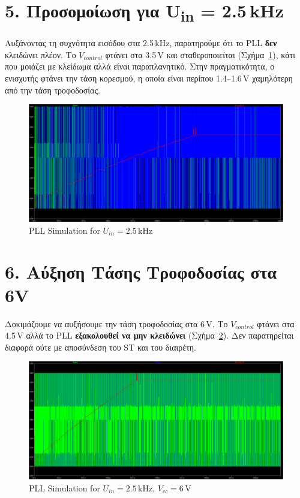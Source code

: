\documentclass[11pt,letterpaper]{article}
\begin{document}
\section*{5. Προσομοίωση για U\textsubscript{in} = 2.5 kHz}
Αυξάνοντας τη συχνότητα εισόδου στα 2.5 kHz, παρατηρούμε ότι το PLL \textbf{δεν} κλειδώνει πλέον. Το \( V_{control} \) φτάνει στα 3.5 V και σταθεροποιείται (Σχήμα~\ref{fig:pll_simulation_2.5khz}), κάτι που μοιάζει με κλείδωμα αλλά είναι παραπλανητικό.
Στην πραγματικότητα, ο ενισχυτής φτάνει την τάση κορεσμού, η οποία είναι περίπου 1.4–1.6 V χαμηλότερη από την τάση τροφοδοσίας.

\begin{figure}[H]
    \centering
    \includegraphics[width=\textwidth]{figures/sim4.png}
    \caption{PLL Simulation for \( U_{in} = 2.5\,\text{kHz} \)}
    \label{fig:pll_simulation_2.5khz}
\end{figure}


\section*{6. Αύξηση Τάσης Τροφοδοσίας στα 6V}
Δοκιμάζουμε να αυξήσουμε την τάση τροφοδοσίας στα 6 V. 
    Το \( V_{control} \) φτάνει στα 4.5 V αλλά το PLL \textbf{εξακολουθεί να μην κλειδώνει} (Σχήμα~\ref{fig:pll_simulation_2.5khz_6v}). Δεν παρατηρείται διαφορά ούτε με αποσύνδεση του ST και του διαιρέτη.

\begin{figure}[H]
    \centering
    \includegraphics[width=\textwidth]{figures/sim5.png}
    \caption{PLL Simulation for \( U_{in} = 2.5\,\text{kHz} \), \( V_{cc} = 6\,\text{V} \)}
    \label{fig:pll_simulation_2.5khz_6v}
\end{figure}
\end{document}

